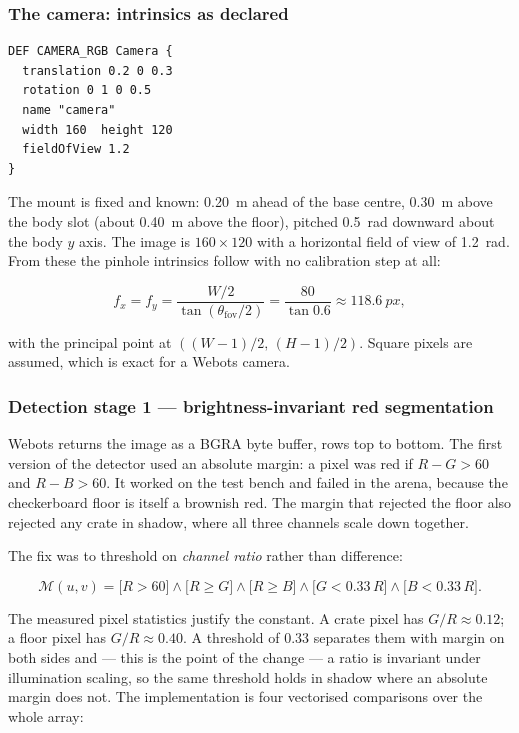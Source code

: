 \subsubsection{The camera: intrinsics as declared}

\begin{lstlisting}[style=xml]
DEF CAMERA_RGB Camera {
  translation 0.2 0 0.3
  rotation 0 1 0 0.5
  name "camera"
  width 160  height 120
  fieldOfView 1.2
}
\end{lstlisting}

The mount is fixed and known: \SI{0.20}{m} ahead of the base centre,
\SI{0.30}{m} above the body slot (about \SI{0.40}{m} above the floor),
pitched \SI{0.5}{rad} downward about the body $y$ axis. The image is
$160 \times 120$ with a horizontal field of view of \SI{1.2}{rad}. From
these the pinhole intrinsics follow with no calibration step at all:

\begin{equation}
f_x = f_y = \frac{W/2}{\tan(\theta_{\mathrm{fov}}/2)} = \frac{80}{\tan 0.6}
     \approx \SI{118.6}{px},
\label{eq:focal}
\end{equation}

with the principal point at $((W-1)/2,\,(H-1)/2)$. Square pixels are
assumed, which is exact for a Webots camera.

\subsubsection{Detection stage 1 --- brightness-invariant red segmentation}

Webots returns the image as a BGRA byte buffer, rows top to bottom. The
first version of the detector used an absolute margin: a pixel was red
if $R - G > 60$ and $R - B > 60$. It worked on the test bench and failed
in the arena, because the checkerboard floor is itself a brownish red.
The margin that rejected the floor also rejected any crate in shadow,
where all three channels scale down together.

The fix was to threshold on \emph{channel ratio} rather than difference:

\begin{equation}
\mathcal{M}(u,v) =
\big[R > 60\big] \wedge
\big[R \ge G\big] \wedge
\big[R \ge B\big] \wedge
\big[G < 0.33\,R\big] \wedge
\big[B < 0.33\,R\big].
\label{eq:redmask}
\end{equation}

The measured pixel statistics justify the constant. A crate pixel has
$G/R \approx 0.12$; a floor pixel has $G/R \approx 0.40$. A threshold of
$0.33$ separates them with margin on both sides and --- this is the point
of the change --- a ratio is invariant under illumination scaling, so
the same threshold holds in shadow where an absolute margin does not.
The implementation is four vectorised comparisons over the whole array:

